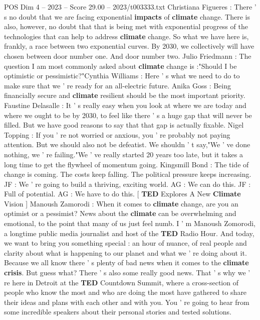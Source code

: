 \begin{textsample}{POS Dim 4 – 2023 – Score 29.00 – 2023/t003333.txt}  \label{ex:f4_pos_032}
Christiana Figueres : There ' s no doubt that we are facing exponential \textbf{impacts} of \textbf{climate} change.
There is also, however, no doubt that that is being met with exponential progress of the technologies that can help to address \textbf{climate} change.
So what we have here is, frankly, a race between two exponential curves.
By 2030, we collectively will have chosen between door number one.
And door number two.
Julio Friedmann : The question I am most commonly asked about \textbf{climate} change is :"Should I be optimistic or pessimistic?"Cynthia Williams : Here ' s what we need to do to make sure that we ' re ready for an all-electric future.
Anika Goss : Being financially secure and \textbf{climate} resilient should be the most important priority.
Faustine Delasalle : It ' s really easy when you look at where we are today and where we ought to be by 2030, to feel like there ' s a huge gap that will never be filled.
But we have good reasons to say that that gap is actually fixable.
Nigel Topping : If you ' re not worried or anxious, you ' re probably not paying attention.
But we should also not be defeatist.
We shouldn ' t say,"We ' ve done nothing, we ' re failing."We ' ve really started 20 years too late, but it takes a long time to get the flywheel of momentum going.
Kingsmill Bond : The tide of change is coming.
The costs keep falling.
The political pressure keeps increasing.
JF : We ' re going to build a thriving, exciting world.
AG : We can do this.
JF : Full of potential.
AG : We have to do this. [ \textbf{TED} Explores A New \textbf{Climate} Vision ] Manoush Zamorodi : When it comes to \textbf{climate} change, are you an optimist or a pessimist?
News about the \textbf{climate} can be overwhelming and emotional, to the point that many of us just feel numb.
I ' m Manoush Zomorodi, a longtime public media journalist and host of the \textbf{TED} Radio Hour.
And today, we want to bring you something special : an hour of nuance, of real people and clarity about what is happening to our planet and what we ' re doing about it.
Because we all know there ' s plenty of bad news when it comes to the \textbf{climate} \textbf{crisis}.
But guess what?
There ' s also some really good news.
That ' s why we ' re here in Detroit at the \textbf{TED} Countdown Summit, where a cross-section of people who know the most and who are doing the most have gathered to share their ideas and plans with each other and with you.
You ' re going to hear from some incredible speakers about their personal stories and tested solutions.

\end{textsample}
